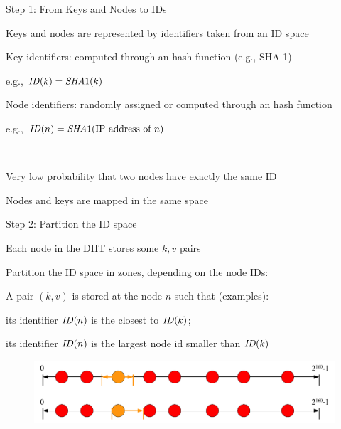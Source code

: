 \begin{frame}{Step 1: From Keys and Nodes to IDs}

\BIL
\item Keys and nodes are represented by \alert{identifiers} taken from an \alert{ID space} 
\BI
\item Key identifiers: computed through an \alert{hash function} (e.g., SHA-1)
  \BI
  \item e.g., $\mathit{ID}(k) = \mathit{SHA}1(k)$
  \EI
\item Node identifiers: randomly assigned or computed through an hash function
  \BI
  \item e.g., $\mathit{ID}(n) =\mathit{SHA}1(\textrm{IP address of $n$})$
  \EI
\EI
\EIL

\bigskip
{}\\
\BIL
\item Very low probability that two nodes have exactly the same ID
\item Nodes and keys are mapped in the same space
\EIL

\end{frame}

\begin{frame}{Step 2: Partition the ID space}

\BIL
\item Each node in the DHT stores some $k,v$ pairs
\item Partition the ID space in zones, depending on the node IDs:
\item A pair $(k,v)$ is stored at the node $n$ such that (examples):
\BI
\item its identifier $\mathit{ID}(n)$ is the closest to $\mathit{ID}(k)$;
\item its identifier $\mathit{ID}(n)$ is the largest node id smaller than $\mathit{ID}(k)$
\EI
\EIL

\begin{figure}
	\includegraphics[width=\textwidth]{dht-partition}
\end{figure}

\end{frame}

